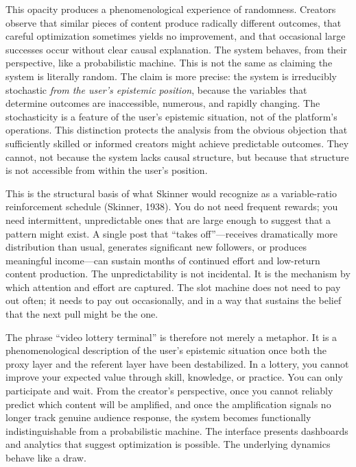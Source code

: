 \documentclass[12pt, a4paper]{article}
\begin{document}
This opacity produces a phenomenological experience of randomness. Creators observe that similar pieces of content produce radically different outcomes, that careful optimization sometimes yields no improvement, and that occasional large successes occur without clear causal explanation. The system behaves, from their perspective, like a probabilistic machine. This is not the same as claiming the system is literally random. The claim is more precise: the system is irreducibly stochastic \textit{from the user's epistemic position}, because the variables that determine outcomes are inaccessible, numerous, and rapidly changing. The stochasticity is a feature of the user's epistemic situation, not of the platform's operations. This distinction protects the analysis from the obvious objection that sufficiently skilled or informed creators might achieve predictable outcomes. They cannot, not because the system lacks causal structure, but because that structure is not accessible from within the user's position.

This is the structural basis of what Skinner would recognize as a variable-ratio reinforcement schedule (Skinner, 1938). You do not need frequent rewards; you need intermittent, unpredictable ones that are large enough to suggest that a pattern might exist. A single post that ``takes off''---receives dramatically more distribution than usual, generates significant new followers, or produces meaningful income---can sustain months of continued effort and low-return content production. The unpredictability is not incidental. It is the mechanism by which attention and effort are captured. The slot machine does not need to pay out often; it needs to pay out occasionally, and in a way that sustains the belief that the next pull might be the one.

The phrase ``video lottery terminal'' is therefore not merely a metaphor. It is a phenomenological description of the user's epistemic situation once both the proxy layer and the referent layer have been destabilized. In a lottery, you cannot improve your expected value through skill, knowledge, or practice. You can only participate and wait. From the creator's perspective, once you cannot reliably predict which content will be amplified, and once the amplification signals no longer track genuine audience response, the system becomes functionally indistinguishable from a probabilistic machine. The interface presents dashboards and analytics that suggest optimization is possible. The underlying dynamics behave like a draw.
\end{document}
